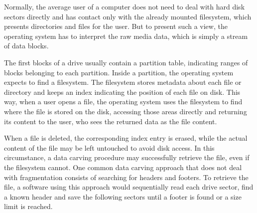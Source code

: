 

Normally, the average user of a computer does not need to deal with hard disk sectors directly and has contact only with the already mounted filesystem, which presents directories and files for the user. But to present such a view, the operating system has to interpret the raw media data, which is simply a stream of data blocks.

The first blocks of a drive usually contain a partition table, indicating ranges of blocks belonging to each partition. Inside a partition, the operating system expects to find a filesystem. The filesystem stores metadata about each file or directory and keeps an index indicating the position of each file on disk. This way, when a user opens a file, the operating system uses the filesystem to find where the file is stored on the disk, accessing those areas directly and returning its content to the user, who sees the returned data as the file content. 

When a file is deleted, the corresponding index entry is erased, while the actual content of the file may be left untouched to avoid disk access. In this circumstance, a data carving procedure may successfully retrieve the file, even if the filesystem cannot. One common data carving approach that does not deal with fragmentation consists of searching for headers and footers. To retrieve the file, a software using this approach would sequentially read each drive sector, find a known header and save the following sectors until a footer is found or a size limit is reached. 
